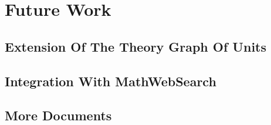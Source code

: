 \section{Future Work}
\label{sec:future}
\subsection{Extension Of The Theory Graph Of Units}
\subsection{Integration With MathWebSearch}
\subsection{More Documents}



